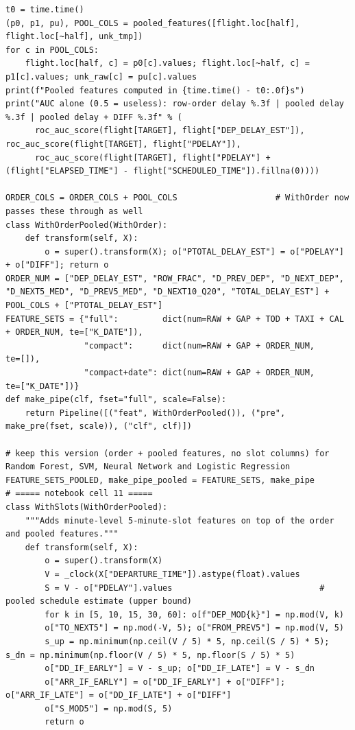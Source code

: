 \documentclass[12pt,a4paper]{article}
\begin{document}
\begin{lstlisting}[style=code]
t0 = time.time()
(p0, p1, pu), POOL_COLS = pooled_features([flight.loc[half], flight.loc[~half], unk_tmp])
for c in POOL_COLS:
    flight.loc[half, c] = p0[c].values; flight.loc[~half, c] = p1[c].values; unk_raw[c] = pu[c].values
print(f"Pooled features computed in {time.time() - t0:.0f}s")
print("AUC alone (0.5 = useless): row-order delay %.3f | pooled delay %.3f | pooled delay + DIFF %.3f" % (
      roc_auc_score(flight[TARGET], flight["DEP_DELAY_EST"]), roc_auc_score(flight[TARGET], flight["PDELAY"]),
      roc_auc_score(flight[TARGET], flight["PDELAY"] + (flight["ELAPSED_TIME"] - flight["SCHEDULED_TIME"]).fillna(0))))

ORDER_COLS = ORDER_COLS + POOL_COLS                    # WithOrder now passes these through as well
class WithOrderPooled(WithOrder):
    def transform(self, X):
        o = super().transform(X); o["PTOTAL_DELAY_EST"] = o["PDELAY"] + o["DIFF"]; return o
ORDER_NUM = ["DEP_DELAY_EST", "ROW_FRAC", "D_PREV_DEP", "D_NEXT_DEP", "D_NEXT5_MED", "D_PREV5_MED", "D_NEXT10_Q20", "TOTAL_DELAY_EST"] + POOL_COLS + ["PTOTAL_DELAY_EST"]
FEATURE_SETS = {"full":         dict(num=RAW + GAP + TOD + TAXI + CAL + ORDER_NUM, te=["K_DATE"]),
                "compact":      dict(num=RAW + GAP + ORDER_NUM,                    te=[]),
                "compact+date": dict(num=RAW + GAP + ORDER_NUM,                    te=["K_DATE"])}
def make_pipe(clf, fset="full", scale=False):
    return Pipeline([("feat", WithOrderPooled()), ("pre", make_pre(fset, scale)), ("clf", clf)])

# keep this version (order + pooled features, no slot columns) for Random Forest, SVM, Neural Network and Logistic Regression
FEATURE_SETS_POOLED, make_pipe_pooled = FEATURE_SETS, make_pipe
# ===== notebook cell 11 =====
class WithSlots(WithOrderPooled):
    """Adds minute-level 5-minute-slot features on top of the order and pooled features."""
    def transform(self, X):
        o = super().transform(X)
        V = _clock(X["DEPARTURE_TIME"]).astype(float).values
        S = V - o["PDELAY"].values                              # pooled schedule estimate (upper bound)
        for k in [5, 10, 15, 30, 60]: o[f"DEP_MOD{k}"] = np.mod(V, k)
        o["TO_NEXT5"] = np.mod(-V, 5); o["FROM_PREV5"] = np.mod(V, 5)
        s_up = np.minimum(np.ceil(V / 5) * 5, np.ceil(S / 5) * 5); s_dn = np.minimum(np.floor(V / 5) * 5, np.floor(S / 5) * 5)
        o["DD_IF_EARLY"] = V - s_up; o["DD_IF_LATE"] = V - s_dn
        o["ARR_IF_EARLY"] = o["DD_IF_EARLY"] + o["DIFF"]; o["ARR_IF_LATE"] = o["DD_IF_LATE"] + o["DIFF"]
        o["S_MOD5"] = np.mod(S, 5)
        return o


\end{lstlisting}
\end{document}

